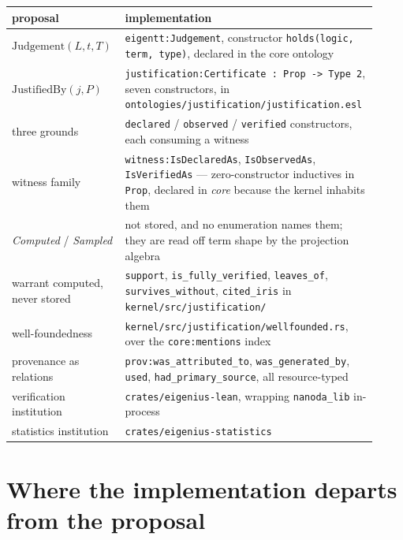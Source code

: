 \documentclass[manuscript,nonacm=true]{acmart}
\newcommand{\code}[1]{\texttt{\small #1}}
\newcommand{\Prop}{\code{Prop}}
\begin{document}
\begin{table}[h]
\small
\begin{tabular}{@{}p{0.30\linewidth}p{0.62\linewidth}@{}}
\toprule
\textbf{proposal} & \textbf{implementation} \\
\midrule
$\mathrm{Judgement}(L, t, T)$ &
\code{eigentt:Judgement}, constructor \code{holds(logic, term, type)}, declared in the core ontology \\

$\mathrm{JustifiedBy}(j, P)$ &
\code{justification:Certificate : Prop -> Type 2}, seven constructors, in \code{ontologies/justification/justification.esl} \\

three grounds &
\code{declared} / \code{observed} / \code{verified} constructors, each consuming a witness \\

witness family &
\code{witness:IsDeclaredAs}, \code{IsObservedAs}, \code{IsVerifiedAs} --- zero-constructor inductives in \Prop{}, declared in \emph{core} because the kernel inhabits them \\

\emph{Computed} / \emph{Sampled} &
not stored, and no enumeration names them; they are read off term shape by the projection algebra \\

warrant computed, never stored &
\code{support}, \code{is\_fully\_verified}, \code{leaves\_of}, \code{survives\_without}, \code{cited\_iris} in \code{kernel/src/justification/} \\

well-foundedness &
\code{kernel/src/justification/wellfounded.rs}, over the \code{core:mentions} index \\

provenance as relations &
\code{prov:was\_attributed\_to}, \code{was\_generated\_by}, \code{used}, \code{had\_primary\_source}, all resource-typed \\

verification institution &
\code{crates/eigenius-lean}, wrapping \code{nanoda\_lib} in-process \\

statistics institution &
\code{crates/eigenius-statistics} \\
\bottomrule
\end{tabular}
\end{table}

\section{Where the implementation departs from the proposal}
\end{document}
